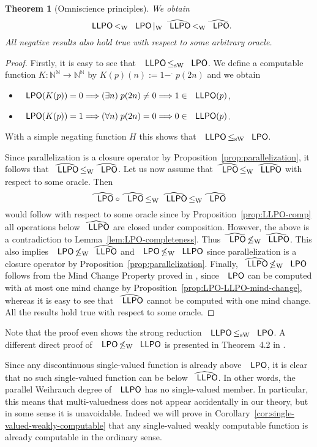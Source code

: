 \documentclass[jsl,10pt]{noasl}
\def\IN{{\mathbb{N}}}
\def\TO{\Longrightarrow}
\def\dmin{-^{\!\!\!\!\cdot}\;}
\def\LPO{\text{\rm\sffamily LPO}}
\def\LLPO{\text{\rm\sffamily LLPO}}
\def\LPO{\text{\rm\sffamily LPO}}
\def\LLPO{\text{\rm\sffamily LLPO}}
\def\leqW{\mathop{\leq_{\mathrm{W}}}}
\def\leqSW{\mathop{\leq_{\mathrm{sW}}}}
\def\nleqW{\mathop{\not\leq_{\mathrm{W}}}}
\def\lW{\mathop{<_{\mathrm{W}}}}
\def\nW{\mathop{|_{\mathrm{W}}}}
\newtheorem{theorem}[proposition]{Theorem}
\begin{document}
\begin{theorem}[Omniscience principles]
\label{thm:omniscience}
We obtain 
\[\LLPO\lW\LPO\nW\widehat{\LLPO}\lW\widehat{\LPO}.\]
All negative results also hold true with respect to some arbitrary oracle.
\end{theorem}
\begin{proof}
Firstly, it is easy to see that $\LLPO\leqSW\LPO$.
We define a computable function $K:\IN^\IN\to\IN^\IN$ by
$K(p)(n):=1\dmin p(2n)$ and we obtain
\begin{itemize}
\item $\LPO(K(p))=0\TO(\exists n)\;p(2n)\not=0\TO 1\in\LLPO(p)$,
\item $\LPO(K(p))=1\TO(\forall n)\;p(2n)=0\TO0\in\LLPO(p)$.
\end{itemize}
With a simple negating function $H$ this shows that $\LLPO\leqSW\LPO$.

Since parallelization is a closure operator by Proposition~\ref{prop:parallelization},
it follows that $\widehat{\LLPO}\leqW\widehat{\LPO}$. 
Let us now assume that $\widehat{\LPO}\leqW\widehat{\LLPO}$ with respect to some oracle.
Then 
\[\widehat{\LPO}\circ\widehat{\LPO}\leqW\widehat{\LLPO}\leqW\widehat{\LPO}\] 
would follow with respect to some oracle since by Proposition~\ref{prop:LLPO-comp} 
all operations below $\widehat{\LLPO}$ are closed under composition.
However, the above is a contradiction to Lemma~\ref{lem:LPO-completeness}.
Thus $\widehat{\LPO}\nleqW\widehat{\LLPO}$. 
This also implies $\LPO\nleqW\widehat{\LLPO}$ and $\LPO\nleqW\LLPO$ since parallelization 
is a closure operator by Proposition~\ref{prop:parallelization}.
Finally, $\widehat{\LLPO}\nleqW\LPO$ follows from the Mind Change Property proved in \cite{BG09b}, 
since $\LPO$ can be computed with at most one mind change by Proposition~\ref{prop:LPO-LLPO-mind-change}, 
whereas it is easy to see that $\widehat{\LLPO}$ cannot be computed with one mind change.
All the results hold true with respect to some oracle.
\end{proof}

Note that the proof even shows the strong reduction $\LLPO\leqSW\LPO$.
A different direct proof of $\LPO\nleqW\LLPO$ is presented in Theorem~4.2 in \cite{Wei92c}.

Since any discontinuous single-valued function is already above $\LPO$,
it is clear that no such single-valued function can be below $\widehat{\LLPO}$.
In other words, the parallel Weihrauch degree of $\LLPO$ has no single-valued member.
In particular, this means that multi-valuedness does not appear
accidentally in our theory, but in some sense it is unavoidable.
Indeed we will prove in Corollary~\ref{cor:single-valued-weakly-computable}
that any single-valued weakly computable function is already computable
in the ordinary sense.
\end{document}
